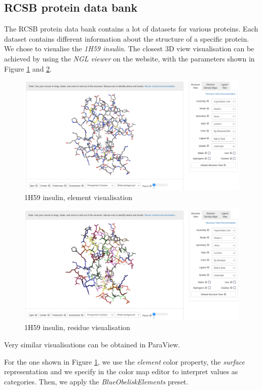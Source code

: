 \documentclass[openany]{article}
\begin{document}
\subsection {RCSB protein data bank}

The RCSB protein data bank contains a lot of datasets for various proteins. Each dataset contains different information about the structure of a specific protein. We chose to visualise the \textit{1H59 insulin}. The closest 3D view visualisation can be achieved by using the \textit{NGL viewer} on the website, with the parameters shown in Figure \ref{insulin_el} and \ref{insulin_res}.

\begin{figure} [h!]
\centering
\includegraphics[width=0.8\linewidth]{Proteins/1h59_insulin_el}
\caption{1H59 insulin, element visualisation}
\label{insulin_el}
\end{figure}

\begin{figure} [h!]
\centering
\includegraphics[width=0.8\linewidth]{Proteins/1h59_insulin_res}
\caption{1H59 insulin, residue visualisation}
\label{insulin_res}
\end{figure}

Very similar visualisations can be obtained in ParaView. 

For the one shown in Figure \ref{insulin_el}, we use the \textit{element} color property, the \textit{surface} representation and we specify in the color map editor to interpret values as categories. Then, we apply the \textit{BlueObeliskElements} preset.
\end{document}
